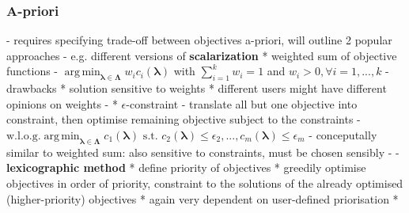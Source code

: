\documentclass[twoside,11pt]{article}
\DeclareMathOperator*{\argmin}{arg\,min}
\begin{document}
\subsubsection{A-priori}
- requires specifying trade-off between objectives a-priori, will outline 2 popular approaches
- e.g. different versions of \textbf{scalarization}
  * weighted sum of objective functions
    - $\argmin_{\boldsymbol\lambda\in\boldsymbol\Lambda} w_i c_i(\boldsymbol\lambda)$ with $\sum_{i=1}^k w_i=1$ and $w_i>0,\forall i=1,...,k$
    - drawbacks
      * solution sensitive to weights
      * different users might have different opinions on weights \citep[chap. 3.1]{NSGA}
    - \citep[p. 11]{10.1145/3610536}
  * $\epsilon$-constraint
    - translate all but one objective into constraint, then optimise remaining objective subject to the constraints
    - $\text{w.l.o.g.} \argmin_{\boldsymbol\lambda\in\boldsymbol\Lambda} c_1(\boldsymbol\lambda) \text{ s.t. } c_2(\boldsymbol\lambda)\le\epsilon_2,...,c_m(\boldsymbol\lambda)\le\epsilon_m$
    - conceputally similar to weighted sum: also sensitive to constraints, must be chosen sensibly
    - \citep[p. 12]{10.1145/3610536}
- \textbf{lexicographic method}
  * define priority of objectives
  * greedily optimise objectives in order of priority, constraint to the solutions of the already optimised (higher-priority) objectives
  * again very dependent on user-defined priorisation
  * \citep[p. 13749]{lexicographic_MOO}  %
\end{document}
